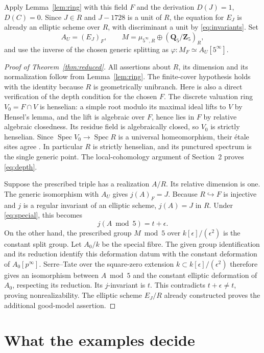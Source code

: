 \documentclass[11pt]{article}
\theoremstyle{remark}\newtheorem{remark}[theorem]{Remark}
\newcommand{\Spec}{\operatorname{Spec}}
\begin{document}
Apply Lemma~\ref{lem:ring} with this field $F$ and the derivation $D(J)=1$, $D(C)=0$. Since $J\in R$ and $J-1728$ is a unit of $R$, the equation for $E_J$ is already an elliptic scheme over $R$, with discriminant a unit by \eqref{eq:invariants}. Set
\[
 A_U=(E_J)_F,\qquad
 M=\mu_{5^\infty,R}\oplus(\mathbf Q_5/\mathbf Z_5)_R,
\]
and use the inverse of the chosen generic splitting as $\varphi:M_F\simeq A_U[5^\infty]$.

\begin{proof}[Proof of Theorem~\ref{thm:reduced}]
All assertions about $R$, its dimension and its normalization follow from Lemma~\ref{lem:ring}. The finite-cover hypothesis holds with the identity because $R$ is geometrically unibranch. Here is also a direct verification of the depth condition for the chosen $F$. The discrete valuation ring $V_0=F\cap V$ is henselian: a simple root modulo its maximal ideal lifts to $V$ by Hensel's lemma, and the lift is algebraic over $F$, hence lies in $F$ by relative algebraic closedness. Its residue field is algebraically closed, so $V_0$ is strictly henselian. Since $\Spec V_0\to\Spec R$ is a universal homeomorphism, their \'etale sites agree \citep[Tag~04DY]{Stacks}. In particular $R$ is strictly henselian, and its punctured spectrum is the single generic point. The local-cohomology argument of Section~2 proves \eqref{eq:depth}.

Suppose the prescribed triple has a realization $A/R$. Its relative dimension is one. The generic isomorphism with $A_U$ gives $j(A)_F=J$. Because $R\hookrightarrow F$ is injective and $j$ is a regular invariant of an elliptic scheme, $j(A)=J$ in $R$. Under \eqref{eq:special}, this becomes
\[
 j(A\bmod5)=t+\epsilon.
\]
On the other hand, the prescribed group $M\bmod5$ over $k[\epsilon]/(\epsilon^2)$ is the constant split group. Let $A_0/k$ be the special fibre. The given group identification and its reduction identify this deformation datum with the constant deformation of $A_0[p^\infty]$. Serre--Tate over the square-zero extension $k\subset k[\epsilon]/(\epsilon^2)$ therefore gives an isomorphism between $A\bmod5$ and the constant elliptic deformation of $A_0$, respecting its reduction. Its $j$-invariant is $t$. This contradicts $t+\epsilon\ne t$, proving nonrealizability. The elliptic scheme $E_J/R$ already constructed proves the additional good-model assertion.
\end{proof}

\section{What the examples decide}
\end{document}
